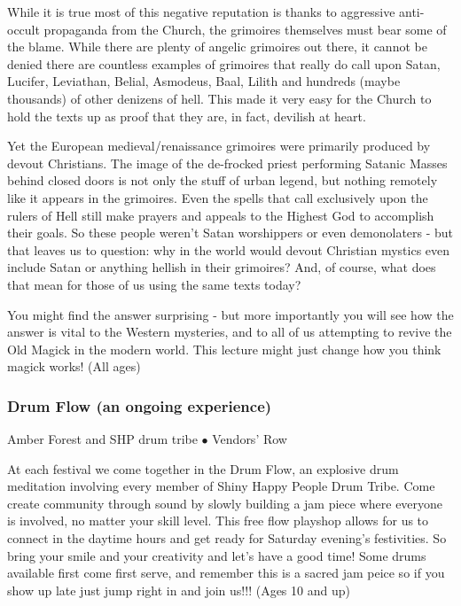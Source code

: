 While it is true most of this negative reputation is thanks to aggressive anti-occult propaganda from the Church, the grimoires themselves must bear some of the blame.  While there are plenty of angelic grimoires out there, it cannot be denied there are countless examples of grimoires that really do call upon Satan, Lucifer, Leviathan, Belial, Asmodeus, Baal, Lilith and hundreds (maybe thousands) of other denizens of hell.  This made it very easy for the Church to hold the texts up as proof that they are, in fact, devilish at heart.

Yet the European medieval/renaissance grimoires were primarily produced by devout Christians.  The image of the de-frocked priest performing Satanic Masses behind closed doors is not only the stuff of urban legend, but nothing remotely like it appears in the grimoires. Even the spells that call exclusively upon the rulers of Hell still make prayers and appeals to the Highest God to accomplish their goals.  So these people weren't Satan worshippers or even demonolaters - but that leaves us to question:  why in the world would devout Christian mystics even include Satan or anything hellish in their grimoires?  And, of course, what does that mean for those of us using the same texts today?

You might find the answer surprising - but more importantly you will see how the answer is vital to the Western mysteries, and to all of us attempting to revive the Old Magick in the modern world.  This lecture might just change how you think magick works! {\small (All ages)}

\subsubsection{Drum Flow (an ongoing experience)}
\label{Sat-Shiny1}
{\small Amber Forest and SHP drum tribe $\bullet$  Vendors' Row}

 At each festival we come together in the Drum Flow, an explosive drum meditation involving every member of Shiny Happy People Drum Tribe. Come create community through sound by slowly building a jam piece where everyone is involved, no matter your skill level. This free flow playshop allows for us to connect in the daytime hours and get ready for Saturday evening's festivities. So bring your smile and your creativity and let's have a good time! Some drums available first come first serve, and remember this is a sacred jam peice so if you show up late just jump right in and join us!!! {\small (Ages 10 and up)}

